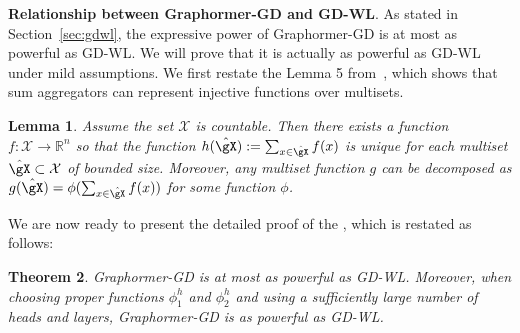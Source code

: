 \documentclass{article} %
\let\cref\crtcref
\newtheorem{theorem}{Theorem}[section]
\newtheorem{lemma}[theorem]{Lemma}
\begin{document}
\textbf{Relationship between Graphormer-GD and GD-WL}.
As stated in Section~\ref{sec:gdwl}, the expressive power of Graphormer-GD is at most as powerful as GD-WL. We will prove that it is actually as powerful as GD-WL under mild assumptions. We first restate the Lemma 5 from~\citet{xu2019powerful}, which shows that sum aggregators can represent injective functions over multisets.
\begin{lemma}
    \label{thm:lemma-injective-multiset}
    \citep[Lemma 5]{xu2019powerful}
    Assume the set $\mathcal{X}$ is countable. Then there exists a function $f:\mathcal{X}\to\mathbb{R}^n$ so that the function $h(\hat\gX):=\sum_{x\in \hat\gX}f(x)$ is unique for each multiset $\hat \gX\subset\mathcal{X}$ of bounded size. Moreover, any multiset function $g$ can be decomposed as $g(\hat\gX)=\phi(\sum_{x\in \hat\gX}f(x))$ for some function $\phi$.
\end{lemma}
We are now ready to present the detailed proof of the \cref{thm:Graphormer-GD-gdwl}, which is restated as follows: 
\begin{theorem}
\label{thm:Graphormer-GD-gdwl-restate}
Graphormer-GD is at most as powerful as GD-WL. Moreover, when choosing proper functions $\phi_1^h$ and $\phi_2^h$ and using a sufficiently large number of heads and layers, Graphormer-GD is as powerful as GD-WL.
\end{theorem}
\end{document}
